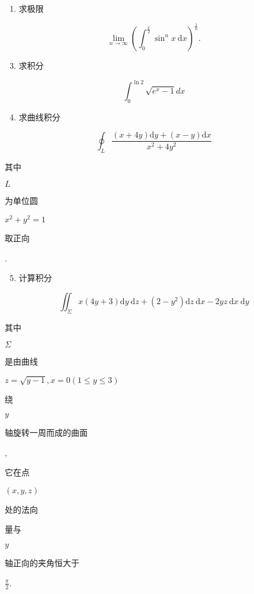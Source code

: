 \documentclass[10pt]{article}
\begin{document}
\begin{enumerate}
  \item \begin{CJK}{UTF8}{mj}求极限\end{CJK}
\end{enumerate}
$$
\lim _{n \rightarrow \infty}\left(\int_{0}^{\frac{\pi}{2}} \sin ^{n} x \mathrm{~d} x\right)^{\frac{1}{n}} .
$$

\begin{enumerate}
  \setcounter{enumi}{2}
  \item \begin{CJK}{UTF8}{mj}求积分\end{CJK}
\end{enumerate}
$$
\int_{0}^{\ln 2} \sqrt{e^{x}-1} d x
$$

\begin{enumerate}
  \setcounter{enumi}{3}
  \item \begin{CJK}{UTF8}{mj}求曲线积分\end{CJK}
\end{enumerate}
$$
\oint_{L} \frac{(x+4 y) \mathrm{d} y+(x-y) \mathrm{d} x}{x^{2}+4 y^{2}}
$$
\begin{CJK}{UTF8}{mj}其中\end{CJK} $L$ \begin{CJK}{UTF8}{mj}为单位圆\end{CJK} $x^{2}+y^{2}=1$ \begin{CJK}{UTF8}{mj}取正向\end{CJK}.

\begin{enumerate}
  \setcounter{enumi}{4}
  \item \begin{CJK}{UTF8}{mj}计算积分\end{CJK}
\end{enumerate}
$$
\iint_{\Sigma} x(4 y+3) \mathrm{d} y \mathrm{~d} z+\left(2-y^{2}\right) \mathrm{d} z \mathrm{~d} x-2 y z \mathrm{~d} x \mathrm{~d} y
$$
\begin{CJK}{UTF8}{mj}其中\end{CJK} $\Sigma$ \begin{CJK}{UTF8}{mj}是由曲线\end{CJK} $z=\sqrt{y-1}, x=0(1 \leqslant y \leqslant 3)$ \begin{CJK}{UTF8}{mj}绕\end{CJK} $y$ \begin{CJK}{UTF8}{mj}轴旋转一周而成的曲面\end{CJK}, \begin{CJK}{UTF8}{mj}它在点\end{CJK} $(x, y, z)$ \begin{CJK}{UTF8}{mj}处的法向\end{CJK} \begin{CJK}{UTF8}{mj}量与\end{CJK} $y$ \begin{CJK}{UTF8}{mj}轴正向的夹角恒大于\end{CJK} $\frac{\pi}{2}$.
\end{document}
